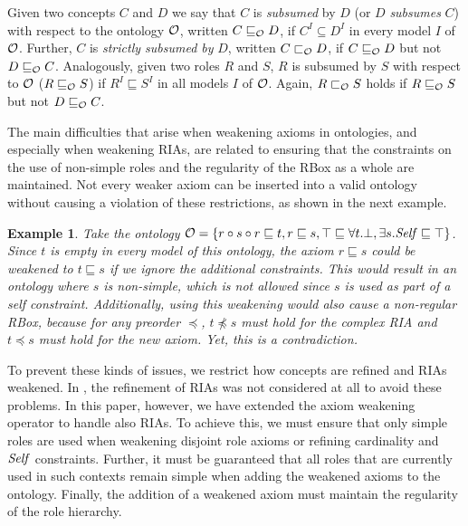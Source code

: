 \documentclass[
]{ceurart}
\newtheorem{example}{Example}
\begin{document}
Given two concepts $C$ and $D$ we say that $C$ is \emph{subsumed} by $D$ (or $D$ \emph{subsumes} $C$) with respect to the ontology $\mathcal{O}$, written $C \sqsubseteq_\mathcal{O} D$, if $C^I \subseteq D^I$ in every model $I$ of $\mathcal{O}$. Further, $C$ is \emph{strictly subsumed by} $D$, written $C \sqsubset_\mathcal{O} D$, if $C \sqsubseteq_\mathcal{O} D$ but not $D \sqsubseteq_\mathcal{O} C$. Analogously, given two roles $R$ and $S$, $R$ is subsumed by $S$ with respect to $\mathcal{O}$ ($R \sqsubseteq_\mathcal{O} S$) if $R^I \sqsubseteq S^I$ in all models $I$ of $\mathcal{O}$. Again, $R \sqsubset_\mathcal{O} S$ holds if $R \sqsubseteq_\mathcal{O} S$ but not $D \sqsubseteq_\mathcal{O} C$.

The main difficulties that arise when weakening axioms in \SROIQ ontologies, and especially when weakening RIAs, are related to ensuring that the constraints on the use of non-simple roles and the regularity of the RBox as a whole are maintained. Not every weaker axiom can be inserted into a valid \SROIQ ontology without causing a violation of these restrictions, as shown in the next example.

\begin{example}
  Take the ontology $\mathcal{O} = \{ r \circ s \circ r \sqsubseteq t, r \sqsubseteq s, \top \sqsubseteq \forall t.\bot, \exists s.\mathit{Self} \sqsubseteq \top \}$. Since $t$ is empty in every model of this ontology, the axiom $r \sqsubseteq s$ could be weakened to $t \sqsubseteq s$ if we ignore the additional constraints. This would result in an ontology where $s$ is non-simple, which is not allowed since $s$ is used as part of a self constraint.
  Additionally, using this weakening would also cause a non-regular RBox, because for any preorder $\preceq$, $t \not\preceq s$ must hold for the complex RIA and $t \preceq s$ must hold for the new axiom. Yet, this is a contradiction.
\end{example}

To prevent these kinds of issues, we restrict how concepts are refined and RIAs weakened. In \cite{confalonieri2020towards}, the refinement of RIAs was not considered at all to avoid these problems. In this paper, however, we have extended the axiom weakening operator to handle also RIAs. To achieve this, we must ensure that only simple roles are used when weakening disjoint role axioms or refining cardinality and $\mathit{Self}$ constraints.  
%
Further, it must be guaranteed that all roles that are currently used in such contexts remain simple when adding the weakened axioms to the ontology. Finally, the addition of a weakened axiom must maintain the regularity of the role hierarchy. 
\end{document}
